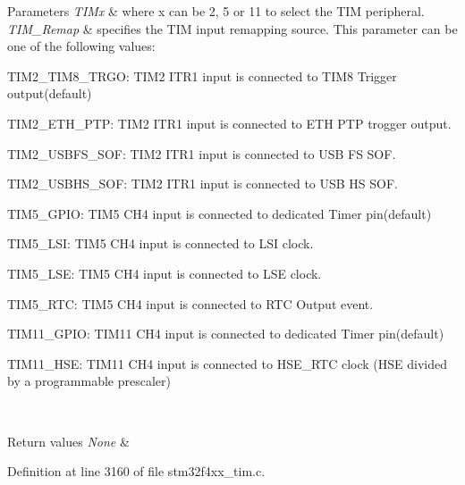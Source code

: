 \begin{DoxyParams}{Parameters}
{\em T\+I\+Mx} & where x can be 2, 5 or 11 to select the T\+IM peripheral. \\
\hline
{\em T\+I\+M\+\_\+\+Remap} & specifies the T\+IM input remapping source. This parameter can be one of the following values\+: \begin{DoxyItemize}
\item T\+I\+M2\+\_\+\+T\+I\+M8\+\_\+\+T\+R\+GO\+: T\+I\+M2 I\+T\+R1 input is connected to T\+I\+M8 Trigger output(default) \item T\+I\+M2\+\_\+\+E\+T\+H\+\_\+\+P\+TP\+: T\+I\+M2 I\+T\+R1 input is connected to E\+TH P\+TP trogger output. \item T\+I\+M2\+\_\+\+U\+S\+B\+F\+S\+\_\+\+S\+OF\+: T\+I\+M2 I\+T\+R1 input is connected to U\+SB FS S\+OF. \item T\+I\+M2\+\_\+\+U\+S\+B\+H\+S\+\_\+\+S\+OF\+: T\+I\+M2 I\+T\+R1 input is connected to U\+SB HS S\+OF. \item T\+I\+M5\+\_\+\+G\+P\+IO\+: T\+I\+M5 C\+H4 input is connected to dedicated Timer pin(default) \item T\+I\+M5\+\_\+\+L\+SI\+: T\+I\+M5 C\+H4 input is connected to L\+SI clock. \item T\+I\+M5\+\_\+\+L\+SE\+: T\+I\+M5 C\+H4 input is connected to L\+SE clock. \item T\+I\+M5\+\_\+\+R\+TC\+: T\+I\+M5 C\+H4 input is connected to R\+TC Output event. \item T\+I\+M11\+\_\+\+G\+P\+IO\+: T\+I\+M11 C\+H4 input is connected to dedicated Timer pin(default) \item T\+I\+M11\+\_\+\+H\+SE\+: T\+I\+M11 C\+H4 input is connected to H\+S\+E\+\_\+\+R\+TC clock (H\+SE divided by a programmable prescaler) \end{DoxyItemize}
\\
\hline
\end{DoxyParams}

\begin{DoxyRetVals}{Return values}
{\em None} & \\
\hline
\end{DoxyRetVals}


Definition at line 3160 of file stm32f4xx\+\_\+tim.\+c.

